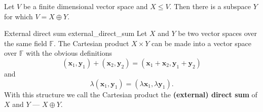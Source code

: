\begin{lemma}{\cite{math2601_notes}}{}
	Let $V$ be a finite dimensional vector space and $X \leq V$. Then there is a subspace $Y$ for which $V = X \oplus Y$.
\end{lemma}

\begin{definition}{External direct sum \cite{math2601_notes}}{external_direct_sum}
	Let $X$ and $Y$ be two vector									 spaces over the same field $\mathbb{F}$. The Cartesian product $X \times Y$ can be made into a vector space over $\mathbb{F}$ with the obvious definitions
	$$
		(\mathbf{x}_1, \mathbf{y}_1) + (\mathbf{x}_2, \mathbf{y}_2)
		= (\mathbf{x}_1 + \mathbf{x}_2, \mathbf{y}_1 + \mathbf{y}_2)
	$$
	and
	$$ \lambda (\mathbf{x}_1, \mathbf{y}_1) = (\lambda \mathbf{x}_1, \lambda \mathbf{y}_1) . $$
	With this structure we call the Cartesian product the \textbf{(external) direct sum} of $X$ and $Y$ --- $X \oplus Y$.
\end{definition}